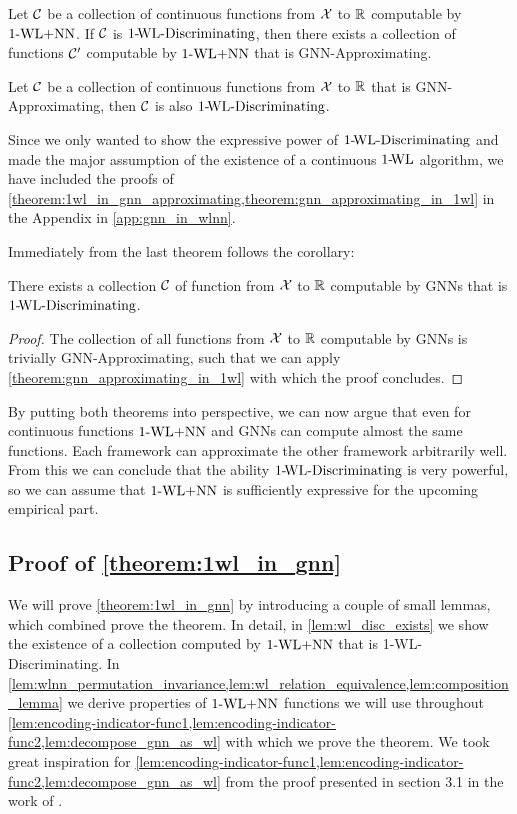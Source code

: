 \begin{theorem}\label{theorem:1wl_in_gnn_approximating}
    Let $\mathcal{C}$ be a collection of continuous functions from $\mathcal{X}$ to $\mathbb{R}$ computable by $\text{1-WL+NN}$. If $\mathcal{C}$ is $\text{1-\!WL-Discriminating}$, then there exists a collection of functions $\mathcal{C}'$ computable by $\text{1-WL+NN}$ that is GNN-Approximating.
\end{theorem}

\begin{theorem}\label{theorem:gnn_approximating_in_1wl}
    Let $\mathcal{C}$ be a collection of continuous functions from $\mathcal{X}$ to $\mathbb{R}$ that is GNN-Approximating, then $\mathcal{C}$ is also $\text{1-\!WL-Discriminating}$.
\end{theorem}

Since we only wanted to show the expressive power of $\text{1-\!WL-Discriminating}$ and made the major assumption of the existence of a continuous $\text{1-\!WL}$ algorithm, we have included the proofs of \cref{theorem:1wl_in_gnn_approximating,theorem:gnn_approximating_in_1wl} in the Appendix in \autoref{app:gnn_in_wlnn}.

Immediately from the last theorem follows the corollary:
\begin{corollary}
    There exists a collection $\mathcal{C}$ of function from $\mathcal{X}$ to $\mathbb{R}$ computable by GNNs that is $\text{1-\!WL-Discriminating}$.
\end{corollary}

\begin{proof}
    The collection of all functions from $\mathcal{X}$ to $\mathbb{R}$ computable by GNNs is trivially GNN-Approximating, such that we can apply \autoref{theorem:gnn_approximating_in_1wl} with which the proof concludes.
\end{proof}

By putting both theorems into perspective, we can now argue that even for continuous functions $\text{1-WL+NN}$ and GNNs can compute almost the same functions. Each framework can approximate the other framework arbitrarily well. From this we can conclude that the ability $\text{1-\!WL-Discriminating}$ is very powerful, so we can assume that $\text{1-WL+NN}$ is sufficiently expressive for the upcoming empirical part.

\subsection{Proof of \autoref{theorem:1wl_in_gnn}}\label{sec:proof_theorem:1wl_in_gnn}
We will prove \autoref{theorem:1wl_in_gnn} by introducing a couple of small lemmas, which combined prove the theorem. In detail, in \autoref{lem:wl_disc_exists} we show the existence of a collection computed by $\text{1-WL+NN}$ that is 1-\!WL-Discriminating. In \cref{lem:wlnn_permutation_invariance,lem:wl_relation_equivalence,lem:composition_lemma} we derive properties of $\text{1-WL+NN}$ functions we will use throughout \cref{lem:encoding-indicator-func1,lem:encoding-indicator-func2,lem:decompose_gnn_as_wl} with which we prove the theorem.
We took great inspiration for \cref{lem:encoding-indicator-func1,lem:encoding-indicator-func2,lem:decompose_gnn_as_wl} from the proof presented in section 3.1 in the work of \cite{Chen2019}.

